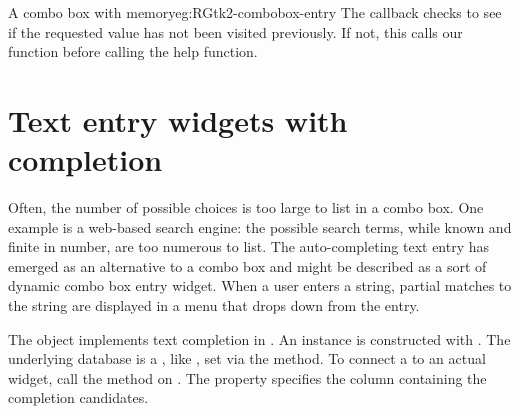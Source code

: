 \begin{example}{A combo box with memory}{eg:RGtk2-combobox-entry}
The  callback checks to see if the requested value has
not been visited previously. If not, this calls our 
function before calling the help function.
\begin{Schunk}
\end{Schunk}


\end{example}




\section{Text entry widgets with completion}
\label{sec:RGtk2:entry-completion}

Often, the number of possible choices is too large to list in a combo
box. One example is a web-based search engine: the possible search
terms, while known and finite in number, are too numerous to list. The
auto-completing text entry has emerged as an alternative to a combo
box and might be described as a sort of dynamic combo box entry widget. 
When a user enters a string, partial matches to the string are
displayed in a menu that drops down from the entry. 

The  object implements text completion in
\GTK. An instance is constructed with
. The underlying database is a
, like , set via the
 method. To connect a
 to an actual  widget, call
the  method on .  The
 property specifies the column containing the
completion candidates. 

